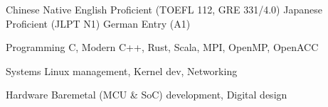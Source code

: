 
\begin{cvskills}

    \cvskill
    {Chinese}
    {Native}
    \cvskill
    {English}
    {Proficient (TOEFL 112, GRE 331/4.0)}
    \cvskill
    {Japanese}
    {Proficient (JLPT N1)}
    \cvskill
    {German}
    {Entry (A1)}


\end{cvskills}


\begin{cvskills}

  \cvskill
    {Programming} %
    {C, Modern C++, Rust, Scala, MPI, OpenMP, OpenACC} %

  \cvskill
    {Systems} %
    {Linux management, Kernel dev, Networking} %

  \cvskill
    {Hardware}
    {Baremetal (MCU \& SoC) development, Digital design}

\end{cvskills}

